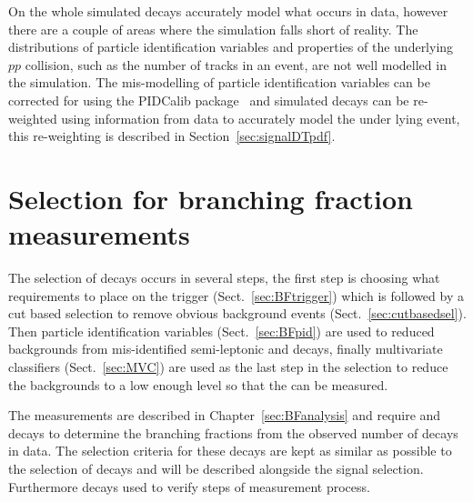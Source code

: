On the whole simulated decays accurately model what occurs in data, however there are a couple of areas where the simulation falls short of reality.
The distributions of particle identification variables and properties of the underlying $pp$ collision, such as the number of tracks in an event, are not well modelled in the simulation. %
The mis-modelling of particle identification variables can be corrected for using the PIDCalib package~\cite{Anderlini:2202412} and simulated decays can be re-weighted using information from data to accurately model the under lying event, this re-weighting is described in Section~\ref{sec:signalDTpdf}. 


\section{Selection for branching fraction measurements}
\label{sec:BFsel}
The selection of \bmumu decays occurs in several steps, the first step is choosing what requirements to place on the trigger (Sect.~\ref{sec:BFtrigger}) which is followed by a cut based selection to remove obvious background events (Sect.~\ref{sec:cutbasedsel}). Then particle identification variables (Sect.~\ref{sec:BFpid}) are used to reduced backgrounds from mis-identified semi-leptonic and \bhh decays, finally multivariate classifiers (Sect.~\ref{sec:MVC}) are used as the last step in the selection to reduce the backgrounds to a low enough level so that the \bmumu \BFs can be measured.%

The \BF measurements are described in Chapter~\ref{sec:BFanalysis} and require \bujpsik and \bhh decays to determine the branching fractions from the observed number of \bmumu decays in data. The selection criteria for these decays are kept as similar as possible to the selection of \bmumu decays and will be described alongside the signal selection. Furthermore \bsjpsiphi decays used to verify steps of measurement process. %


